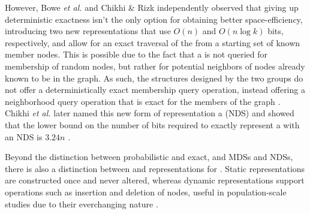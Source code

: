 However, Bowe \emph{et al.} \cite{Bowe2012} and Chikhi \& Rizk \cite{Chikhi2013} independently observed that giving up deterministic exactness isn't the only option for obtaining better space-efficiency, introducing two new representations that use $O(n)$ and $O(n \log k)$ bits, respectively, and allow for an exact traversal of the \dBG from a starting set of known member nodes. This is possible due to the fact that a \dBG is not queried for membership of random nodes, but rather for potential neighbors of nodes already known to be in the graph. As such, the structures designed by the two groups do not offer a deterministically exact membership query operation, instead offering a neighborhood query operation that is exact for the members of the graph \cite{Bowe2012} \cite{Chikhi2013}. Chikhi \emph{et al.} later named this new form of representation a  (NDS) and showed that the lower bound on the number of bits required to exactly represent a \dBG with an NDS is $3.24n$ \cite{Chikhi2014}.

Beyond the distinction between probabilistic and exact, and MDSs and NDSs, there is also a distinction between  and  representations for \dBG. Static representations are constructed once and never altered, whereas dynamic representations support operations such as insertion and deletion of nodes, useful in population-scale studies due to their everchanging nature \cite{Alipanahi2021}.



